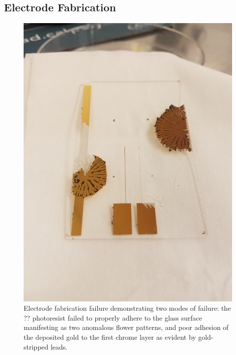 \FloatBarrier


\subsection{Electrode Fabrication}

\begin{figure}[h]
    \centering
    \includegraphics[width=\textwidth]{images/adhesion_issues.jpg}
    \caption{Electrode fabrication failure demonstrating two modes of failure: the ?? photoresist failed to properly adhere to the glass surface manifesting as two anomalous flower patterns, and poor adhesion of the deposited gold to the first chrome layer as evident by gold-stripped leads.}
    \label{fig:failed_electrode_macro}
\end{figure}

